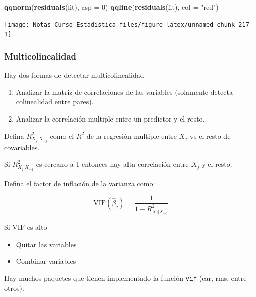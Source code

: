 \documentclass[
  12pt,
]{book}
\newenvironment{Shaded}{\begin{snugshade}}{\end{snugshade}}
\newcommand{\DataTypeTok}[1]{\textcolor[rgb]{0.13,0.29,0.53}{#1}}
\newcommand{\DecValTok}[1]{\textcolor[rgb]{0.00,0.00,0.81}{#1}}
\newcommand{\KeywordTok}[1]{\textcolor[rgb]{0.13,0.29,0.53}{\textbf{#1}}}
\newcommand{\NormalTok}[1]{#1}
\newcommand{\StringTok}[1]{\textcolor[rgb]{0.31,0.60,0.02}{#1}}
\providecommand{\tightlist}{%
  \setlength{\itemsep}{0pt}\setlength{\parskip}{0pt}}
\theoremstyle{definition}
\theoremstyle{definition}
\theoremstyle{definition}
\theoremstyle{remark}
\begin{document}
\begin{Shaded}
\begin{Highlighting}[]
\KeywordTok{qqnorm}\NormalTok{(}\KeywordTok{residuals}\NormalTok{(fit), }\DataTypeTok{asp =} \DecValTok{0}\NormalTok{)}
\KeywordTok{qqline}\NormalTok{(}\KeywordTok{residuals}\NormalTok{(fit), }\DataTypeTok{col =} \StringTok{"red"}\NormalTok{)}
\end{Highlighting}
\end{Shaded}

\begin{center}\texttt{[image: Notas-Curso-Estadistica\_files/figure-latex/unnamed-chunk-217-1]} \end{center}

\hypertarget{multicolinealidad}{%
\subsubsection{Multicolinealidad}\label{multicolinealidad}}

Hay dos formas de detectar multicolinealidad

\begin{enumerate}
\def\labelenumi{\arabic{enumi}.}
\item
  Analizar la matriz de correlaciones de las variables (solamente detecta colinealidad entre pares).
\item
  Analizar la correlación multiple entre un predictor y el resto.
\end{enumerate}

Defina \(R^{2}_{X_{j}\vert X_{-j}}\) como el \(R^{2}\) de la regresión multiple entre \(X_{j}\) vs el resto de covariables.

Si \(R^{2}_{X_{j}\vert X_{-j}}\) es cercano a 1 entonces hay alta correlación entre \(X_j\) y el resto.

Defina el factor de inflación de la varianza como:

\begin{equation*}
 \mathrm{VIF}(\hat{\beta}_{j}) = \frac{1}{1-R^{2}_{X_{j}\vert X_{-j}}}
\end{equation*}

Si \(\mathrm{VIF}\) es alto

\begin{itemize}
\tightlist
\item
  Quitar las variables
\item
  Combinar variables
\end{itemize}

Hay muchos paquetes que tienen implementado la función \texttt{vif} (car, rms, entre otros).
\end{document}
